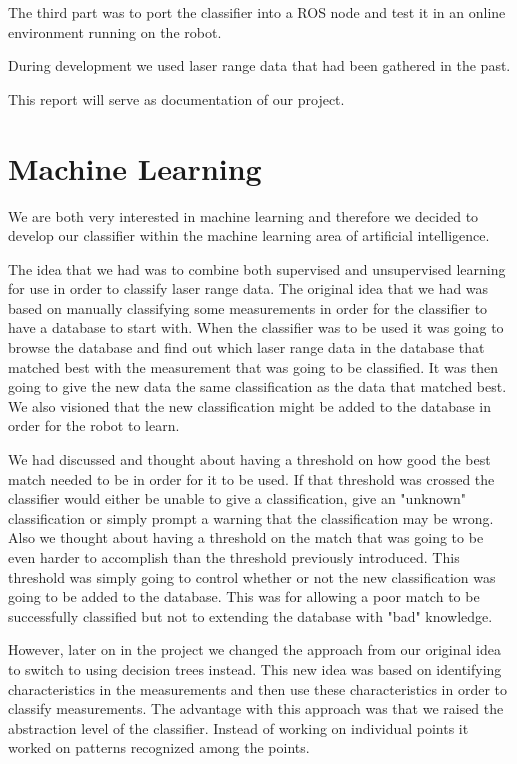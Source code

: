\documentclass[a4paper, 10pt, conference]{ieeeconf}      %
\begin{document}
The third part was to port the classifier into a ROS node and test it in an online environment running on the robot. 

During development we used laser range data that had been gathered in the past.

This report will serve as documentation of our project.

\section{Machine Learning}
We are both very interested in machine learning and therefore we decided to develop our classifier within the machine learning area of artificial intelligence.

The idea that we had was to combine both supervised and unsupervised learning for use in order to classify laser range data. The original idea that we had was based on manually classifying some measurements in order for the classifier to have a database to start with. When the classifier was to be used it was going to browse the database and find out which laser range data in the database that matched best with the measurement that was going to be classified. It was then going to give the new data the same classification as the data that matched best. We also visioned that the new classification might be added to the database in order for the robot to learn.

We had discussed and thought about having a threshold on how good the best match needed to be in order for it to be used. If that threshold was crossed the classifier would either be unable to give a classification, give an "unknown" classification or simply prompt a warning that the classification may be wrong. Also we thought about having a threshold on the match that was going to be even harder to accomplish than the threshold previously introduced. This threshold was simply going to control whether or not the new classification was going to be added to the database. This was for allowing a poor match to be successfully classified but not to extending the database with "bad" knowledge.

However, later on in the project we changed the approach from our original idea to switch to using decision trees instead. This new idea was based on identifying characteristics in the measurements and then use these characteristics in order to classify measurements. The advantage with this approach was that we raised the abstraction level of the classifier. Instead of working on individual points it worked on patterns recognized among the points.
\end{document}
